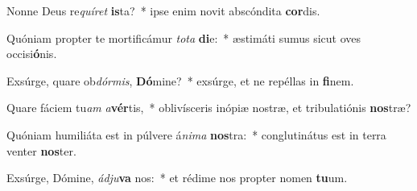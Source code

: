 \item Nonne Deus re\textit{quí}\textit{ret} \textbf{is}ta?~* ipse enim novit abscóndita \textbf{cor}dis.
\item Quóniam propter te mortificámur \textit{to}\textit{ta} \textbf{di}e:~* æstimáti sumus sicut oves occisi\textbf{ó}nis.
\item Exsúrge, quare ob\textit{dór}\textit{mis}, \textbf{Dó}mine?~* exsúrge, et ne repéllas in \textbf{fi}nem.
\item Quare fáciem tu\textit{am} \textit{a}\textbf{vér}tis,~* oblivísceris inópiæ nostræ, et tribulatiónis \textbf{nos}træ?
\item Quóniam humiliáta est in púlvere á\textit{ni}\textit{ma} \textbf{nos}tra:~* conglutinátus est in terra venter \textbf{nos}ter.
\item Exsúrge, Dómine, \textit{ád}\textit{ju}\textbf{va} nos:~* et rédime nos propter nomen \textbf{tu}um.
